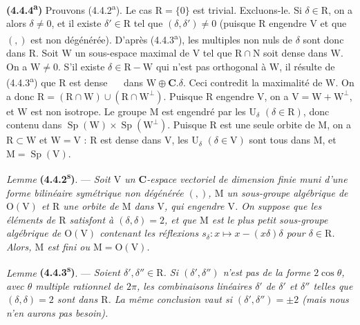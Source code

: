 \documentclass[11pt,leqno]{article}
\newcommand{\Page}[1]{\ifvmode\noindent\else\unskip\ \fi{\footnotesize\textcolor{gray}{[p.\,#1]}}\ \ignorespaces}
\begin{document}
\textbf{(4.4.4\textsuperscript{a})} Prouvons (4.4.2\textsuperscript{a}). Le cas \(\mathrm{R}=\{0\}\) est trivial. Excluons-le. Si \(\delta\in\mathrm{R}\), on a alors \(\delta\neq0\), et il existe \(\delta'\in\mathrm{R}\) tel que \((\delta,\delta')\neq0\) (puisque \(\mathrm{R}\) engendre \(\mathrm{V}\) et que \((,)\) est non dégénérée). D’après (4.4.3\textsuperscript{a}), les multiples non nuls de \(\delta\) sont donc dans \(\mathrm{R}\). Soit \(\mathrm{W}\) un sous-espace maximal de \(\mathrm{V}\) tel que \(\mathrm{R}\cap\mathrm{N}\) soit dense dans \(\mathrm{W}\). On a \(\mathrm{W}\neq0\). S’il existe \(\delta\in\mathrm{R}-\mathrm{W}\) qui n’est pas orthogonal à \(\mathrm{W}\), il résulte de (4.4.3\textsuperscript{a}) que \(\mathrm{R}\) est dense
\Page{228}
dans \(\mathrm{W}\oplus\mathbf{C}.\delta\). Ceci contredit la maximalité de \(\mathrm{W}\). On a donc \(\mathrm{R}=(\mathrm{R}\cap\mathrm{W})\cup(\mathrm{R}\cap\mathrm{W}^{\perp})\). Puisque \(\mathrm{R}\) engendre \(\mathrm{V}\), on a \(\mathrm{V}=\mathrm{W}+\mathrm{W}^{\perp}\), et \(\mathrm{W}\) est non isotrope. Le groupe \(\mathrm{M}\) est engendré par les \(\mathrm{U}_\delta\) \((\delta\in\mathrm{R})\), donc contenu dans \(\operatorname{Sp}(\mathrm{W})\times\operatorname{Sp}(\mathrm{W}^{\perp})\). Puisque \(\mathrm{R}\) est une seule orbite de \(\mathrm{M}\), on a \(\mathrm{R}\subset\mathrm{W}\) et \(\mathrm{W}=\mathrm{V}\) : \(\mathrm{R}\) est dense dans \(\mathrm{V}\), les \(\mathrm{U}_\delta\) \((\delta\in\mathrm{V})\) sont tous dans \(\mathrm{M}\), et \(\mathrm{M}=\operatorname{Sp}(\mathrm{V})\).

\textit{Lemme} \textbf{(4.4.2\textsuperscript{s})}. — \textit{Soit \(\mathrm{V}\) un \(\mathbf{C}\)-espace vectoriel de dimension finie muni d’une forme bilinéaire symétrique non dégénérée \((,)\), \(\mathrm{M}\) un sous-groupe algébrique de \(\mathrm{O}(\mathrm{V})\) et \(\mathrm{R}\) une orbite de \(\mathrm{M}\) dans \(\mathrm{V}\), qui engendre \(\mathrm{V}\). On suppose que les éléments de \(\mathrm{R}\) satisfont à \((\delta,\delta)=2\), et que \(\mathrm{M}\) est le plus petit sous-groupe algébrique de \(\mathrm{O}(\mathrm{V})\) contenant les réflexions \(s_\delta:x\mapsto x-(x\delta)\delta\) pour \(\delta\in\mathrm{R}\). Alors, \(\mathrm{M}\) est fini ou \(\mathrm{M}=\mathrm{O}(\mathrm{V})\).}

\textit{Lemme} \textbf{(4.4.3\textsuperscript{s})}. — \textit{Soient \(\delta',\delta''\in\mathrm{R}\). Si \((\delta',\delta'')\) n’est pas de la forme \(2\cos\theta\), avec \(\theta\) multiple rationnel de \(2\pi\), les combinaisons linéaires \(\delta'\) de \(\delta'\) et \(\delta''\) telles que \((\delta,\delta)=2\) sont dans \(\mathrm{R}\). La même conclusion vaut si \((\delta',\delta'')=\pm2\) (mais nous n’en aurons pas besoin).}
\end{document}
